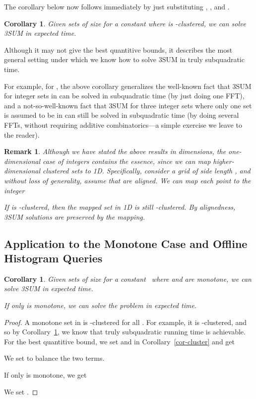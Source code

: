\documentclass[11pt]{article}
\newcommand{\LONG}[1]{#1}\newcommand{\SHORT}[1]{}
\newtheorem{corollary}[theorem]{Corollary}
\newtheorem{rmk}[theorem]{Remark}
\newenvironment{remark}{\begin{rmk}\em}{\end{rmk}}
\begin{document}
The corollary below now follows immediately by
just substituting , , and .

\begin{corollary}\label{cor-general}
Given sets  of size  for a constant  where
 is -clustered,
we can solve 3SUM in  expected time.
\end{corollary}

Although it may not give the best quantitive bounds, it
describes the most general setting under which
we know how to solve 3SUM in truly subquadratic time.

For example, for , the above corollary generalizes the well-known
fact that 3SUM for integer sets in  can be
solved in subquadratic time (by just doing one FFT), and
a not-so-well-known fact that 3SUM for three integer sets where
only one set is assumed to be in  can still be solved
in subquadratic time (by doing several FFTs, without requiring additive combinatorics---a simple exercise we leave to the reader).

\SHORT{
Although we have stated the above results in  dimensions,
the one-dimensional case of integers contains the essence, since we can
map higher-dimensional clustered sets to 1D, as noted in the full
paper.
}
\LONG{
\begin{remark}
Although we have stated the above results in  dimensions,
the one-dimensional case of integers contains the essence, since we can
map higher-dimensional clustered sets to 1D\@.
Specifically,
consider a grid of side length , and
without loss of generality,
assume that  are aligned.
We can map each point  to the integer

If  is -clustered, then the mapped set in 1D is
still -clustered.  By alignedness,
3SUM solutions are preserved by the mapping.
\end{remark}
}

\subsection{Application to the Monotone Case and Offline Histogram
Queries}

\begin{corollary}\label{cor-monotone-offline}
Given sets  of size  for a constant~
where  and  are monotone,
we can solve 3SUM in
 expected time.

If only  is monotone, we can solve the
problem in  expected time.
\end{corollary}
\begin{proof}
A monotone set in  is -clustered
for all .  For example, it is -clustered,
and so by Corollary~\ref{cor-general}, we know that truly
subquadratic running time is achievable.
For the best quantitive bound, we set
 and  in Corollary~\ref{cor-cluster}
and get

We set  to balance the two terms.

If only  is monotone, we get

We set .
\end{proof}
\end{document}
